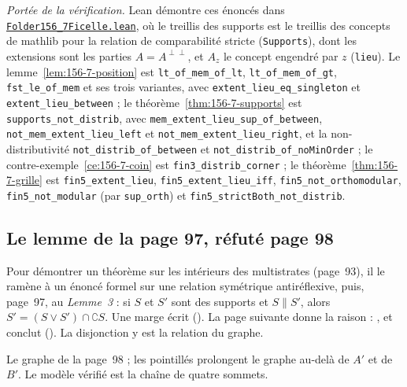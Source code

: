 \begingroup\raggedright
\noindent\emph{Portée de la vérification.} Lean démontre ces énoncés dans \href{\leanblobmain/Order/Folder156_7Ficelle.lean}{\texttt{Folder156\_7Ficelle.\allowbreak{}lean}}, où le treillis des supports est le treillis des concepts de mathlib pour la relation de comparabilité stricte (\texttt{Supports}), dont les extensions sont les parties $A = A^{\perp\perp}$, et $A_z$ le concept engendré par $z$ (\texttt{lieu}). Le lemme~\ref{lem:156-7-position} est \texttt{lt\_of\_mem\_of\_lt}, \texttt{lt\_of\_mem\_of\_gt}, \texttt{fst\_le\_of\_mem} et ses trois variantes, avec \texttt{extent\_lieu\_eq\_singleton} et \texttt{extent\_lieu\_between} ; le théorème~\ref{thm:156-7-supports} est \texttt{supports\_not\_distrib}, avec \texttt{mem\_extent\_lieu\_sup\_of\_between}, \texttt{not\_mem\_extent\_lieu\_left} et \texttt{not\_mem\_extent\_lieu\_right}, et la non-distributivité \texttt{not\_distrib\_of\_between} et \texttt{not\_distrib\_of\_noMinOrder} ; le contre-exemple~\ref{ce:156-7-coin} est \texttt{fin3\_distrib\_corner} ; le théorème~\ref{thm:156-7-grille} est \texttt{fin5\_extent\_lieu}, \texttt{fin5\_extent\_lieu\_iff}, \texttt{fin5\_not\_orthomodular}, \texttt{fin5\_not\_modular} (par \texttt{sup\_orth}) et \texttt{fin5\_strictBoth\_not\_distrib}.\par\endgroup

\subsection*{Le lemme de la page 97, réfuté page 98}

Pour démontrer un théorème sur les intérieurs des multistrates (page~93), il le ramène à un énoncé formel sur une relation symétrique antiréflexive, puis, page~97, au \emph{Lemme~3} : si $S$ et $S'$ sont des supports et $S \parallel S'$, alors $S' = (S \vee S') \cap \complement S$. Une marge écrit  (). La page suivante donne la raison : , et conclut  (). La disjonction y est la relation  du graphe.

\begin{center}
\end{center}
{\small Le graphe de la page~98 ; les pointillés prolongent le graphe au-delà de $A'$ et de $B'$. Le modèle vérifié est la chaîne de quatre sommets.\par}
\medskip


